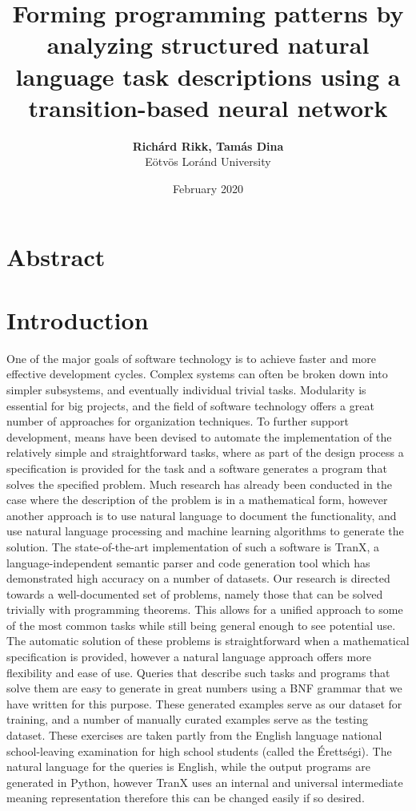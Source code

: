 \documentclass[12pt]{article}
\title{\Huge{\textbf{Forming programming patterns by analyzing structured natural language task descriptions using a transition-based neural network}}}
\author{\textbf{Richárd Rikk, Tamás Dina} \\ Eötvös Loránd University}
\date{February 2020}
\begin{document}
\maketitle

\section*{Abstract}
    \blindtext[1]   

\section{Introduction}
    One of the major goals of software technology is to achieve faster and more effective development cycles. Complex systems can often be broken down into simpler subsystems, and eventually individual trivial tasks. Modularity is essential for big projects, and the field of software technology offers a great number of approaches for organization techniques. To further support development, means have been devised to automate the implementation of the relatively simple and straightforward tasks, where as part of the design process a specification is provided for the task and a software generates a program that solves the specified problem. Much research has already been conducted in the case where the description of the problem is in a mathematical form, however another approach is to use natural language to document the functionality, and use natural language processing and machine learning algorithms to generate the solution. The state-of-the-art implementation of such a software is TranX\cite{TranX}, a language-independent semantic parser and code generation tool which has demonstrated high accuracy on a number of datasets.
    Our research is directed towards a well-documented set of problems, namely those that can be solved trivially with programming theorems\cite{ProgT}. This allows for a unified approach to some of the most common tasks while still being general enough to see potential use. The automatic solution of these problems is straightforward when a mathematical specification is provided, however a natural language approach offers more flexibility and ease of use. Queries that describe such tasks and programs that solve them are easy to generate in great numbers using a BNF grammar that we have written for this purpose. These generated examples serve as our dataset for training, and a number of manually curated examples serve as the testing dataset. These exercises are taken partly from the English language national school-leaving examination for high school students (called the Érettségi).
    The natural language for the queries is English, while the output programs are generated in Python, however TranX uses an internal and universal intermediate meaning representation therefore this can be changed easily if so desired.
\end{document}
